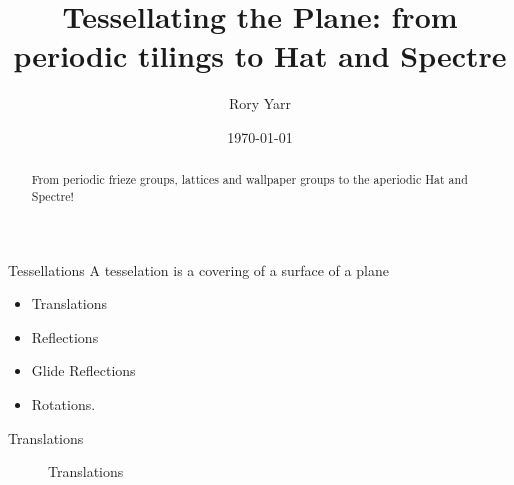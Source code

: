 \documentclass{beamer}
\title[Tilling the Plane]{Tessellating the Plane: from periodic tilings to Hat and Spectre}
\author{Rory Yarr}
\date{\today}
\begin{document}
\begin{frame}
  \titlepage

  \begin{abstract}
    From periodic frieze groups, lattices and wallpaper groups to the aperiodic Hat and Spectre!
  \end{abstract}
\end{frame}

\begin{frame}{Tessellations}
    A tesselation is a covering of a surface of a plane 
    \begin{itemize}
      \item Translations 
      \item Reflections
      \item Glide Reflections
      \item Rotations.
  \end{itemize}
\end{frame}


\begin{frame}{Translations }
   \begin{figure}
        \centering
        \caption{Translations}
        \label{Reflection}
    \end{figure}
\end{frame}
\end{document}
